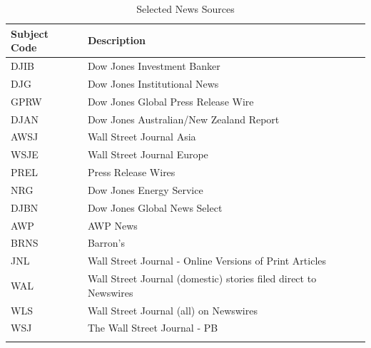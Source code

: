 \begin{table}[H]
	\centering
	\caption{Selected News Sources}
	\begin{tabular}{ll}
		\textbf{Subject Code} & \textbf{Description}                                              \\ \toprule
		DJIB                  & Dow Jones Investment Banker                                        \\
		DJG                   & Dow Jones Institutional News                                       \\
		GPRW                  & Dow Jones Global Press Release Wire                                \\
		DJAN                  & Dow Jones Australian/New Zealand   Report                          \\
		AWSJ                  & Wall Street Journal Asia                                           \\
		WSJE                  & Wall Street Journal Europe                                         \\
		PREL                  & Press Release Wires                                                \\
		NRG                   & Dow Jones Energy Service                                           \\
		DJBN                  & Dow Jones Global News Select                                       \\
		AWP                   & AWP News                                                           \\
		BRNS                  & Barron's                                                           \\
		JNL                   & Wall Street Journal - Online Versions   of Print Articles          \\
		WAL                   & Wall Street Journal (domestic) stories   filed direct to Newswires \\
		WLS                   & Wall Street Journal (all) on Newswires                             \\
		WSJ                   & The Wall Street Journal - PB                                       \\
	                                                             	
	\label{table:news sources}
	\end{tabular}
\end{table}


